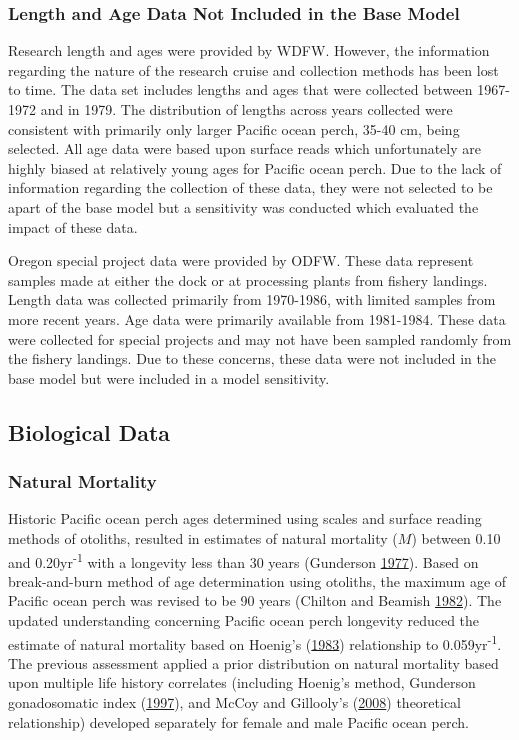 \documentclass[12pt,]{article}
\begin{document}
\subsubsection{Length and Age Data Not Included in the Base
Model}\label{length-and-age-data-not-included-in-the-base-model}

Research length and ages were provided by WDFW. However, the information
regarding the nature of the research cruise and collection methods has
been lost to time. The data set includes lengths and ages that were
collected between 1967-1972 and in 1979. The distribution of lengths
across years collected were consistent with primarily only larger
Pacific ocean perch, 35-40 cm, being selected. All age data were based
upon surface reads which unfortunately are highly biased at relatively
young ages for Pacific ocean perch. Due to the lack of information
regarding the collection of these data, they were not selected to be
apart of the base model but a sensitivity was conducted which evaluated
the impact of these data.

Oregon special project data were provided by ODFW. These data represent
samples made at either the dock or at processing plants from fishery
landings. Length data was collected primarily from 1970-1986, with
limited samples from more recent years. Age data were primarily
available from 1981-1984. These data were collected for special projects
and may not have been sampled randomly from the fishery landings. Due to
these concerns, these data were not included in the base model but were
included in a model sensitivity.

\subsection{Biological Data}\label{biological-data}

\subsubsection{Natural Mortality}\label{natural-mortality}

Historic Pacific ocean perch ages determined using scales and surface
reading methods of otoliths, resulted in estimates of natural mortality
(\(M\)) between 0.10 and 0.20yr\textsuperscript{-1} with a longevity
less than 30 years (Gunderson
\protect\hyperlink{ref-gunderson_population_1977}{1977}). Based on
break-and-burn method of age determination using otoliths, the maximum
age of Pacific ocean perch was revised to be 90 years (Chilton and
Beamish \protect\hyperlink{ref-chilton_age_1982}{1982}). The updated
understanding concerning Pacific ocean perch longevity reduced the
estimate of natural mortality based on Hoenig's
(\protect\hyperlink{ref-hoenig_empirical_1983}{1983}) relationship to
0.059yr\textsuperscript{-1}. The previous assessment applied a prior
distribution on natural mortality based upon multiple life history
correlates (including Hoenig's method, Gunderson gonadosomatic index
(\protect\hyperlink{ref-gunderson_trade-off_1997}{1997}), and McCoy and
Gillooly's (\protect\hyperlink{ref-mccoy_predicting_2008}{2008})
theoretical relationship) developed separately for female and male
Pacific ocean perch.
\end{document}
